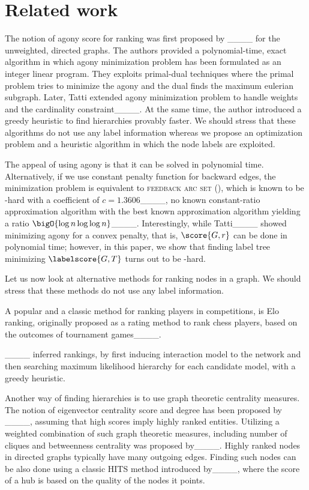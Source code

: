 \section{Related work}
\label{sec:related}

The notion of agony score for  ranking was first proposed by ____ for
the unweighted, directed graphs. The authors provided a
polynomial-time, exact algorithm in which agony minimization problem has been
formulated as an integer linear program. They exploits primal-dual techniques
where the primal problem tries to minimize the agony and  the dual  finds the
maximum eulerian subgraph. Later, Tatti extended agony minimization problem
to handle weights and the cardinality constraint____. At the same time, the author  introduced a
greedy heuristic  to find hierarchies provably  faster.
We should stress that these algorithms do not use any label information whereas
we propose an optimization problem and a heuristic algorithm in which the node
labels are exploited.


The appeal of using agony is that it can be solved in polynomial time.
Alternatively, if we use
constant penalty function for backward edges, the minimization problem is equivalent to \textsc{feedback arc set}
(\fasprb), which is known to be \apx-hard with a coefficient of $c =
1.3606$____, no known constant-ratio
approximation algorithm with the best known approximation algorithm
yielding a ratio $\bigO{\log n \log \log n}$____. Interestingly, while
Tatti____ showed
minimizing agony for a convex penalty, that is, $\score{G, r}$ can be done
in polynomial time; however, in this paper, we show that finding label tree
minimizing $\labelscore{G, T}$ turns out to be \np-hard.

Let us now look at alternative methods for ranking nodes in a graph.
We should stress that these methods do not use any label information.

A popular and a classic method for ranking players in competitions, is Elo
ranking, originally proposed as a rating method to rank chess players, based on
the outcomes of tournament games____. 

____ inferred  rankings, by first inducing interaction
model to the network and then searching maximum likelihood hierarchy  for each
candidate model, with a greedy heuristic.

Another way of finding hierarchies is to use graph theoretic centrality
measures. The notion of  eigenvector centrality score and degree has been
proposed by ____, assuming that high scores imply  highly
ranked entities. Utilizing a weighted combination of such graph theoretic
measures, including  number of cliques and betweenness  centrality was proposed
by____.
Highly ranked nodes in directed graphs typically have many outgoing edges.
Finding such nodes can be also done using a classic HITS method introduced
by____, where the score of a hub is based on the quality
of the nodes it points.